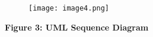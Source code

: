 \documentclass[12pt]{article}
\begin{document}
\vspace{\baselineskip}

\vspace{\baselineskip}

\vspace{\baselineskip}

\vspace{\baselineskip}

\vspace{\baselineskip}

\vspace{\baselineskip}

\vspace{\baselineskip}

\vspace{\baselineskip}

\vspace{\baselineskip}

\vspace{\baselineskip}

\vspace{\baselineskip}

\vspace{\baselineskip}

\vspace{\baselineskip}

\vspace{\baselineskip}

\vspace{\baselineskip}

\vspace{\baselineskip}

\vspace{\baselineskip}

\vspace{\baselineskip}



\begin{figure}[H]
	\begin{Center}
		\texttt{[image: image4.png]}
	\end{Center}
\end{figure}




\vspace{\baselineskip}

\vspace{\baselineskip}
\begin{Center}
\textbf{Figure 3: UML Sequence Diagram}
\end{Center}\par
\end{document}
